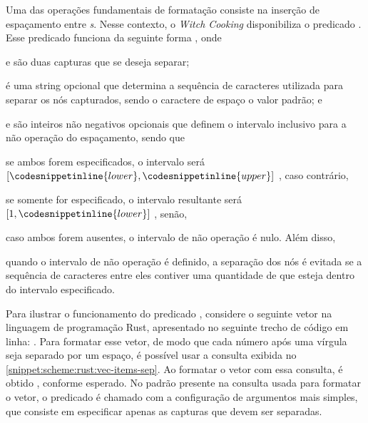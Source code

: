 \documentclass
  [11pt,a4paper,english,brazil,openright,sumario=tradicional,twoside]
  {abntex2}
\newcommand{\witchcooking}{\textit{Witch Cooking}\xspace}
\begin{document}
  Uma das operações fundamentais de formatação consiste na inserção de
  espaçamento entre \textit{s}. Nesse contexto, o \witchcooking
  disponibiliza o predicado . Esse predicado funciona
  da seguinte forma ,
  onde
  \begin{inparaenum}
    \item {} e  são duas capturas que
          se deseja separar;
    \item {} é uma string opcional que determina a
          sequência de caracteres utilizada para separar os nós capturados,
          sendo o caractere de espaço o valor padrão; e
    \item {} e  são inteiros
          não negativos opcionais que definem o intervalo inclusivo para a
          não operação do espaçamento, sendo que
          \begin{inparaenum}
            \item se ambos forem especificados, o intervalo será
                  $ \left
                      [ \codesnippetinline{lower},
                        \codesnippetinline{upper}\right]$%
                  , caso contrário,
            \item se somente  for especificado, o
                  intervalo resultante será
                  $\left[1, \codesnippetinline{lower}\right]$%
                  , senão,
            \item caso ambos forem ausentes, o intervalo de não operação é
                  nulo. Além disso,
            \item quando o intervalo de não operação é definido, a separação
                  dos nós é evitada se a sequência de caracteres entre eles
                  contiver uma quantidade de  que esteja
                  dentro do intervalo especificado.
          \end{inparaenum}
  \end{inparaenum}

  Para ilustrar o funcionamento do predicado ,
  considere o seguinte vetor na linguagem de programação Rust, apresentado no
  seguinte trecho de código em linha: \codesnippetinline[rust]{[0,1,   2,  3]}.
  Para formatar esse vetor, de modo que cada número após uma vírgula seja
  separado por um espaço, é possível usar a consulta exibida no
  \cref{snippet:scheme:rust:vec-items-sep}. Ao formatar o vetor com essa
  consulta, é obtido \codesnippetinline[rust]{[0, 1, 2, 3]}, conforme esperado.
  No padrão presente na consulta usada para formatar o vetor, o predicado
   é chamado com a configuração de argumentos mais
  simples, que consiste em especificar apenas as capturas que devem ser
  separadas.
\end{document}
